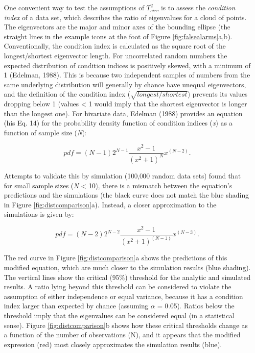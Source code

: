 \documentclass[]{article}
\begin{document}
One convenient way to test the assumptions of \(T^2_{circ}\) is to assess the \emph{condition index} of a data set, which describes the ratio of eigenvalues for a cloud of points. The eigenvectors are the major and minor axes of the bounding ellipse (the straight lines in the example icons at the foot of Figure \ref{fig:falsealarms}a,b). Conventionally, the condition index is calculated as the square root of the longest/shortest eigenvector length. For uncorrelated random numbers the expected distribution of condition indices is positively skewed, with a minimum of 1 (Edelman, 1988). This is because two independent samples of numbers from the same underlying distribution will generally by chance have unequal eigenvectors, and the definition of the condition index (\(\sqrt{longest/shortest}\)) prevents its values dropping below 1 (values \textless{} 1 would imply that the shortest eigenvector is longer than the longest one). For bivariate data, Edelman (1988) provides an equation (his Eq. 14) for the probability density function of condition indices (\emph{x}) as a function of sample size (\emph{N}):

\begin{equation}
\label{eq:edelman1}
pdf = (N-1)2^{N-1}\frac{x^2 - 1}{(x^2 + 1)^N}x^{(N-2)}.
\end{equation}

Attempts to validate this by simulation (100,000 random data sets) found that for small sample sizes (\emph{N} \textless{} 10), there is a mismatch between the equation's predictions and the simulations (the black curve does not match the blue shading in Figure \ref{fig:distcomparison}a). Instead, a closer approximation to the simulations is given by:

\begin{equation}
\label{eq:edelman2}
pdf = (N-2)2^{N-2}\frac{x^2 - 1}{(x^2 + 1)^{(N-1)}}x^{(N-3)}.
\end{equation}

The red curve in Figure \ref{fig:distcomparison}a shows the predictions of this modified equation, which are much closer to the simulation results (blue shading). The vertical lines show the critical (95\%) threshold for the analytic and simulated results. A ratio lying beyond this threshold can be considered to violate the assumption of either independence or equal variance, because it has a condition index larger than expected by chance (assuming \(\alpha\) = 0.05). Ratios below the threshold imply that the eigenvalues can be considered equal (in a statistical sense). Figure \ref{fig:distcomparison}b shows how these critical thresholds change as a function of the number of observations (N), and it appears that the modified expression (red) most closely approximates the simulation results (blue).
\end{document}
